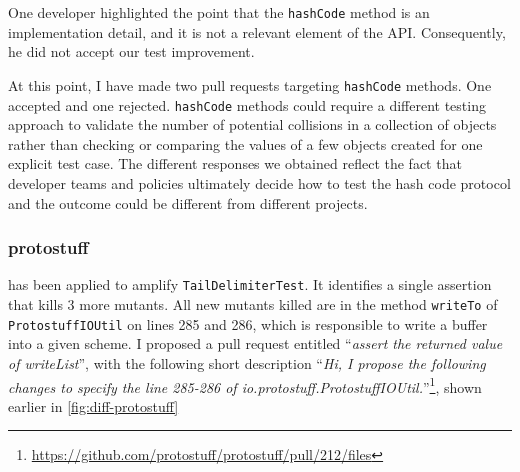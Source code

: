 One developer highlighted the point that the \texttt{hashCode} method is an implementation detail, and it is not a relevant element of the API. 
Consequently, he did not accept our test improvement.

At this point, I have made two pull requests targeting \texttt{hashCode} methods. 
One accepted and one rejected. 
\texttt{hashCode} methods could require a different testing approach to validate the number of potential collisions in a collection of objects rather than checking or comparing the values of a few objects created for one explicit test case. The different responses we obtained reflect the fact that developer teams and policies ultimately decide how to test the hash code protocol and the outcome could be different from different projects.



\subsubsection{protostuff}

\dspot has been applied to amplify \texttt{TailDelimiterTest}. 
It identifies a single assertion that kills 3 more mutants.
All new mutants killed are in the method \texttt{writeTo} of \texttt{ProtostuffIOUtil} on lines 285 and 286, which is responsible to write a buffer into a given scheme. 
I proposed a pull request entitled ``\emph{assert the returned value of writeList}'', with the following short description ``\emph{Hi, I propose the following changes to specify the line 285-286 of io.protostuff.ProtostuffIOUtil.}''\footnote{\url{https://github.com/protostuff/protostuff/pull/212/files}}, shown earlier in \autoref{fig:diff-protostuff}

